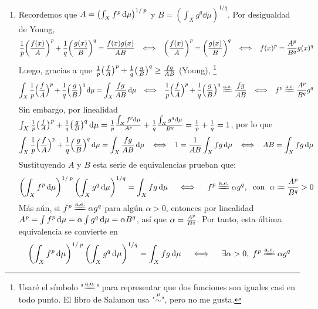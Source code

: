 \begin{sol}
\begin{enumerate}[label = (\roman*), leftmargin=1.5em]
\item 
Recordemos que $A = \left(\int_Xf^{\operatorname{\textit{p}}}\dd{\mu}\right)^{1/\operatorname{\textit{p}}}$ y $B = \left(\int_Xg^{q}\dd{\mu}\right)^{1/q}$.
Por desigualdad de Young, 
\[
\frac{1}{\operatorname{\textit{p}}}\bigg(\frac{f(x)}{A}\bigg)^{\operatorname{\textit{p}}} + \frac{1}{q}\bigg(\frac{g(x)}{B}\bigg)^{q} = \frac{f(x)g(x)}{AB}
\;\;\iff\;\;
\bigg(\frac{f(x)}{A}\bigg)^{\operatorname{\textit{p}}} = \bigg(\frac{g(x)}{B}\bigg)^{q}
\;\;\iff\;\;
f(x)^{\operatorname{\textit{p}}} = \frac{A^{\operatorname{\textit{p}}}}{B^q}g(x)^q
\]
Luego, gracias a que $\frac{1}{\operatorname{\textit{p}}}\big(\frac{f}{A}\big)^{\operatorname{\textit{p}}} + \frac{1}{q}\big(\frac{g}{B}\big)^{q} \ge \frac{fg}{AB}$ (Young),%
\footnote{
    Usaré el símbolo "$\ctpeq$" para representar que dos funciones son iguales casi en todo punto. El libro de Salamon usa "$\overset{\mu}{\sim}$", pero no me gusta.
}
\[
\int_X \frac{1}{\p}\Big(\frac{f}{A}\Big)^{\p} + \frac{1}{q}\Big(\frac{g}{B}\Big)^{q} \dd{\mu}
= \int_X\frac{fg}{AB} \dd{\mu}
\;\;\iff\;\;
\frac{1}{\p}\Big(\frac{f}{A}\Big)^{\p} + \frac{1}{q}\Big(\frac{g}{B}\Big)^{q} 
\ctpeq  \frac{fg}{AB}
\;\;\iff\;\;
f^{\p} \ctpeq \frac{A^{\p}}{B^q}g^q
\]
Sin embargo, por linealidad $\int_X \frac{1}{\operatorname{\textit{p}}}\big(\frac{f}{A}\big)^{\operatorname{\textit{p}}} + \frac{1}{q}\big(\frac{g}{B}\big)^{q} \dd{\mu} = \frac{1}{\operatorname{\textit{p}}}\frac{\int_Xf^{\operatorname{\textit{p}}} \dd{\mu}}{A^{\operatorname{\textit{p}}}} + \frac{1}{q}\frac{\int_Xg^{q} \dd{\mu}}{B^{q}} = \frac{1}{\operatorname{\textit{p}}} + \frac{1}{q} = 1$, por lo que
\[
\int_X \frac{1}{\operatorname{\textit{p}}}\Big(\frac{f}{A}\Big)^{\operatorname{\textit{p}}} + \frac{1}{q}\Big(\frac{g}{B}\Big)^{q} \dd{\mu}
= \int_X\frac{fg}{AB} \dd{\mu}
\;\;\iff\;\;
1 = \frac{1}{AB}\int_X fg \dd{\mu}
\;\;\iff\;\;
AB = \int_X fg \dd{\mu}
\]
Sustituyendo $A$ y $B$ esta serie de equivalencias prueban que:
\[
\left(\int_Xf^{\p}\dd{\mu}\right)^{1/\p} \left(\int_Xg^{q}\dd{\mu}\right)^{1/q} = \int_X fg \dd{\mu}
\quad\iff\quad
f^{\p} \ctpeq \alpha g^q, \;\text{ con }\; \alpha \coloneq \frac{A^{\p}}{B^q} > 0
\]
Más aún, si $f^{\p} \ctpeq \alpha g^q$ para algún $\alpha>0$, entonces por linealidad $A^{\operatorname{\textit{p}}} = \int f^{\operatorname{\textit{p}}}\dd{\mu} = \alpha \int g^q\dd{\mu} = \alpha B^q$, así que $\alpha = \frac{A^{\operatorname{\textit{p}}}}{B^q}$. Por tanto, esta última equivalencia se convierte en 
\[
\left(\int_Xf^{\p}\dd{\mu}\right)^{1/\p} \left(\int_Xg^{q}\dd{\mu}\right)^{1/q} = \int_X fg \dd{\mu}
\quad\iff\quad
\exists \alpha>0,\;
f^{\p} \ctpeq \alpha g^q
\]


\end{enumerate}
\end{sol}

